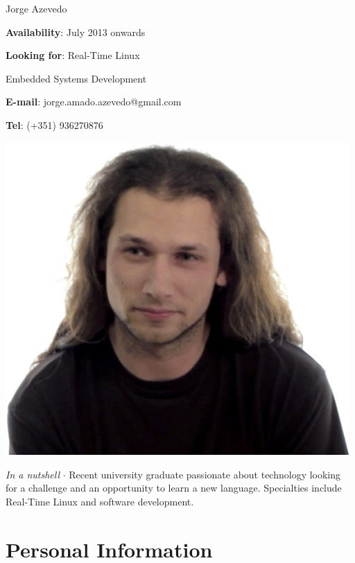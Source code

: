 



\topSection
{
	{\Huge Jorge Azevedo}

	\vspace{1.5mm}
	\vspace*{10mm}

	\textbf{Availability}: July 2013 onwards

	\textbf{Looking for}: Real-Time Linux

	\hspace{66pt}Embedded Systems Development

	\textbf{E-mail}: jorge.amado.azevedo@gmail.com

	\textbf{Tel}: \small{(+351) 936270876}

} {
	\includegraphics[width=0.985\textwidth]{img/photo}
}

\emph{In a nutshell} $\cdot$  Recent university graduate passionate about
technology looking for a challenge and an opportunity to learn
a new language.  Specialties include Real-Time Linux and software development.

\section*{Personal Information}


